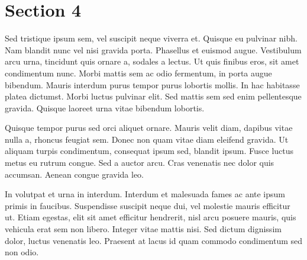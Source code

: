 \documentclass[a4paper, 10pt, conference]{ieeeconf}
\begin{document}
\section{Section 4}

Sed tristique ipsum sem, vel suscipit neque viverra et. Quisque eu pulvinar nibh. Nam blandit nunc vel nisi gravida porta. Phasellus et euismod augue. Vestibulum arcu urna, tincidunt quis ornare a, sodales a lectus. Ut quis finibus eros, sit amet condimentum nunc. Morbi mattis sem ac odio fermentum, in porta augue bibendum. Mauris interdum purus tempor purus lobortis mollis. In hac habitasse platea dictumst. Morbi luctus pulvinar elit. Sed mattis sem sed enim pellentesque gravida. Quisque laoreet urna vitae bibendum lobortis.

Quisque tempor purus sed orci aliquet ornare. Mauris velit diam, dapibus vitae nulla a, rhoncus feugiat sem. Donec non quam vitae diam eleifend gravida. Ut aliquam turpis condimentum, consequat ipsum sed, blandit ipsum. Fusce luctus metus eu rutrum congue. Sed a auctor arcu. Cras venenatis nec dolor quis accumsan. Aenean congue gravida leo.

In volutpat et urna in interdum. Interdum et malesuada fames ac ante ipsum primis in faucibus. Suspendisse suscipit neque dui, vel molestie mauris efficitur ut. Etiam egestas, elit sit amet efficitur hendrerit, nisl arcu posuere mauris, quis vehicula erat sem non libero. Integer vitae mattis nisi. Sed dictum dignissim dolor, luctus venenatis leo. Praesent at lacus id quam commodo condimentum sed non odio.



\end{document}
